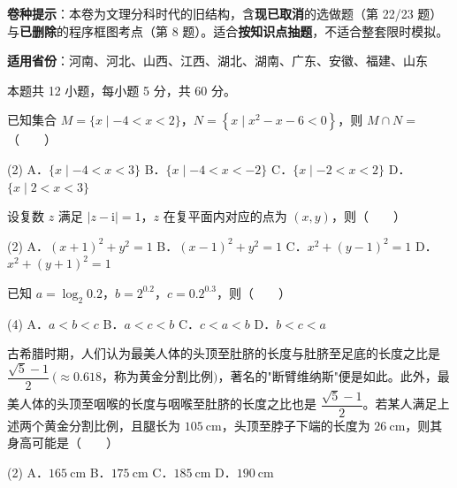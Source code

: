 

\begin{gknotice}
\textbf{ 卷种提示}：本卷为文理分科时代的旧结构，含\textbf{现已取消}的选做题（第 22/23 题）与\textbf{已删除}的程序框图考点（第 8 题）。适合\textbf{按知识点抽题}，不适合整套限时模拟。

\textbf{适用省份}：河南、河北、山西、江西、湖北、湖南、广东、安徽、福建、山东
\end{gknotice}

\par\medskip


\begin{gktip}
本题共 12 小题，每小题 5 分，共 60 分。
\end{gktip}

已知集合 $M=\{x\mid-4<x<2\}$，$N=\left\{x\mid x^{2}-x-6<0\right\}$，则 $M\cap N=$（　　）

\begin{gkopts}(2)
\task A．$\{x\mid-4<x<3\}$
\task B．$\{x\mid-4<x<-2\}$
\task C．$\{x\mid-2<x<2\}$
\task D．$\{x\mid2<x<3\}$
\end{gkopts}

设复数 $z$ 满足 $|z-\mathrm i|=1$，$z$ 在复平面内对应的点为 $(x,y)$，则（　　）

\begin{gkopts}(2)
\task A．$(x+1)^{2}+y^{2}=1$
\task B．$(x-1)^{2}+y^{2}=1$
\task C．$x^{2}+(y-1)^{2}=1$
\task D．$x^{2}+(y+1)^{2}=1$
\end{gkopts}

已知 $a=\log_2 0.2$，$b=2^{0.2}$，$c=0.2^{0.3}$，则（　　）

\begin{gkopts}(4)
\task A．$a<b<c$
\task B．$a<c<b$
\task C．$c<a<b$
\task D．$b<c<a$
\end{gkopts}

古希腊时期，人们认为最美人体的头顶至肚脐的长度与肚脐至足底的长度之比是 $\dfrac{\sqrt5-1}2\ (\approx0.618$，称为黄金分割比例$)$，著名的"断臂维纳斯"便是如此。此外，最美人体的头顶至咽喉的长度与咽喉至肚脐的长度之比也是 $\dfrac{\sqrt5-1}2$。若某人满足上述两个黄金分割比例，且腿长为 $105\ \mathrm{cm}$，头顶至脖子下端的长度为 $26\ \mathrm{cm}$，则其身高可能是（　　）

\begin{gkopts}(2)
\task A．$165\ \mathrm{cm}$
\task B．$175\ \mathrm{cm}$
\task C．$185\ \mathrm{cm}$
\task D．$190\ \mathrm{cm}$
\end{gkopts}

